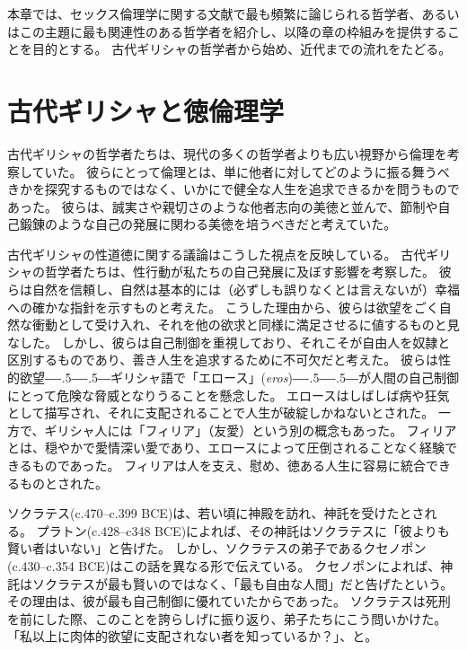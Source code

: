 \documentclass[paper=a4,book,openany]{jlreq}
\def\DDASH{―\kern-.5\zw―\kern-.5\zw―} %
\begin{document}
本章では、セックス倫理学に関する文献で最も頻繁に論じられる哲学者、あるいはこの主題に最も関連性のある哲学者を紹介し、以降の章の枠組みを提供することを目的とする。
古代ギリシャの哲学者から始め、近代までの流れをたどる。

\section{古代ギリシャと徳倫理学}

古代ギリシャの哲学者たちは、現代の多くの哲学者よりも広い視野から倫理を考察していた。
彼らにとって倫理とは、単に他者に対してどのように振る舞うべきかを探究するものではなく、いかにで健全な人生を追求できるかを問うものであった。
彼らは、誠実さや親切さのような他者志向の美徳と並んで、節制や自己鍛錬のような自己の発展に関わる美徳を培うべきだと考えていた。

古代ギリシャの性道徳に関する議論はこうした視点を反映している。
古代ギリシャの哲学者たちは、性行動が私たちの自己発展に及ぼす影響を考察した。
彼らは自然を信頼し、自然は基本的には（必ずしも誤りなくとは言えないが）幸福への確かな指針を示すものと考えた。
こうした理由から、彼らは欲望をごく自然な衝動として受け入れ、それを他の欲求と同様に満足させるに値するものと見なした。
しかし、彼らは自己制御を重視しており、それこそが自由人を奴隷と区別するものであり、善き人生を追求するために不可欠だと考えた。
彼らは性的欲望{\DDASH}ギリシャ語で「エロース」(\emph{eros}){\DDASH}が人間の自己制御にとって危険な脅威となりうることを懸念した。
エロースはしばしば病や狂気として描写され、それに支配されることで人生が破綻しかねないとされた。
一方で、ギリシャ人には「フィリア」（友愛）という別の概念もあった。
フィリアとは、穏やかで愛情深い愛であり、エロースによって圧倒されることなく経験できるものであった。
フィリアは人を支え、慰め、徳ある人生に容易に統合できるものとされた。

ソクラテス(c.470--c.399 BCE)は、若い頃に神殿を訪れ、神託を受けたとされる。
プラトン(c.428--c348 BCE)によれば、その神託はソクラテスに「彼よりも賢い者はいない」と告げた。
しかし、ソクラテスの弟子であるクセノポン(c.430--c.354 BCE)はこの話を異なる形で伝えている。
クセノポンによれば、神託はソクラテスが最も賢いのではなく、「最も自由な人間」だと告げたという。
その理由は、彼が最も自己制御に優れていたからであった。
ソクラテスは死刑を前にした際、このことを誇らしげに振り返り、弟子たちにこう問いかけた。
「私以上に肉体的欲望に支配されない者を知っているか？」、と\citep[16]{xenophon13:_apolog_socrat}。
\end{document}
